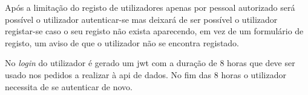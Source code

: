 Após a limitação do registo de utilizadores apenas por pessoal autorizado será possível o utilizador autenticar-se mas deixará de ser possível o utilizador registar-se caso o seu registo não exista aparecendo, em vez de um formulário de registo, um aviso de que o utilizador não se encontra registado.

No \textit{login} do utilizador é gerado um \acrshort{jwt} com a duração de 8 horas que deve ser usado nos pedidos a realizar à \acrshort{api} de dados. No fim das 8 horas o utilizador necessita de se autenticar de novo.
